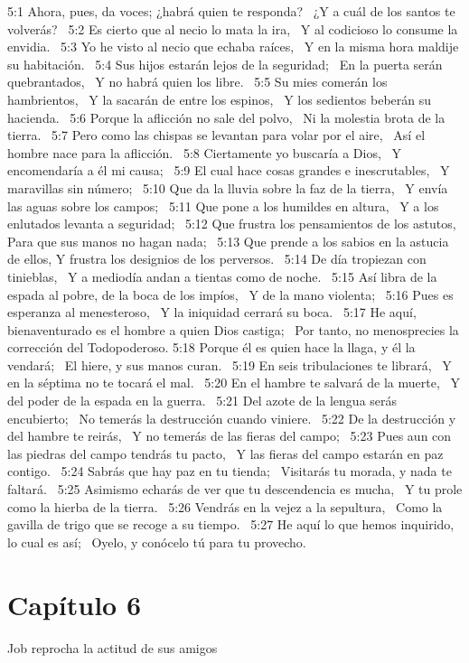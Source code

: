 5:1 Ahora, pues, da voces; ¿habrá quien te responda?  
¿Y a cuál de los santos te volverás?  
5:2 Es cierto que al necio lo mata la ira,  
Y al codicioso lo consume la envidia.  
5:3 Yo he visto al necio que echaba raíces,  
Y en la misma hora maldije su habitación.  
5:4 Sus hijos estarán lejos de la seguridad;  
En la puerta serán quebrantados,  
Y no habrá quien los libre.  
5:5 Su mies comerán los hambrientos,  
Y la sacarán de entre los espinos,  
Y los sedientos beberán su hacienda.  
5:6 Porque la aflicción no sale del polvo,  
Ni la molestia brota de la tierra.  
5:7 Pero como las chispas se levantan para volar por el aire,  
Así el hombre nace para la aflicción.  
5:8 Ciertamente yo buscaría a Dios,  
Y encomendaría a él mi causa;  
5:9 El cual hace cosas grandes e inescrutables,  
Y maravillas sin número;  
5:10 Que da la lluvia sobre la faz de la tierra,  
Y envía las aguas sobre los campos;  
5:11 Que pone a los humildes en altura,  
Y a los enlutados levanta a seguridad;  
5:12 Que frustra los pensamientos de los astutos,  
Para que sus manos no hagan nada;  
5:13 Que prende a los sabios en la astucia de ellos, 
Y frustra los designios de los perversos.  
5:14 De día tropiezan con tinieblas,  
Y a mediodía andan a tientas como de noche.  
5:15 Así libra de la espada al pobre, de la boca de los impíos,  
Y de la mano violenta;  
5:16 Pues es esperanza al menesteroso,  
Y la iniquidad cerrará su boca.  
5:17 He aquí, bienaventurado es el hombre a quien Dios castiga;  
Por tanto, no menosprecies la corrección del Todopoderoso. 
5:18 Porque él es quien hace la llaga, y él la vendará;  
El hiere, y sus manos curan.  
5:19 En seis tribulaciones te librará,  
Y en la séptima no te tocará el mal.  
5:20 En el hambre te salvará de la muerte,  
Y del poder de la espada en la guerra.  
5:21 Del azote de la lengua serás encubierto;  
No temerás la destrucción cuando viniere.  
5:22 De la destrucción y del hambre te reirás,  
Y no temerás de las fieras del campo;  
5:23 Pues aun con las piedras del campo tendrás tu pacto,  
Y las fieras del campo estarán en paz contigo.  
5:24 Sabrás que hay paz en tu tienda;  
Visitarás tu morada, y nada te faltará.  
5:25 Asimismo echarás de ver que tu descendencia es mucha,  
Y tu prole como la hierba de la tierra.  
5:26 Vendrás en la vejez a la sepultura,  
Como la gavilla de trigo que se recoge a su tiempo.  
5:27 He aquí lo que hemos inquirido, lo cual es así;  
Oyelo, y conócelo tú para tu provecho.  
\section*{Capítulo 6 }
Job reprocha la actitud de sus amigos  

